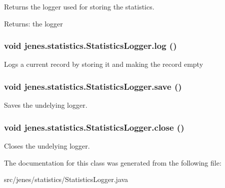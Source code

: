 Returns the logger used for storing the statistics.

\begin{Desc}
\item[Returns:]the logger \end{Desc}
\hypertarget{classjenes_1_1statistics_1_1_statistics_logger_35539d6c4f5664617185d68c6efdf66a}{
\subsubsection[log]{\setlength{\rightskip}{0pt plus 5cm}void jenes.statistics.StatisticsLogger.log ()}}
\label{classjenes_1_1statistics_1_1_statistics_logger_35539d6c4f5664617185d68c6efdf66a}


Logs a current record by storing it and making the record empty \hypertarget{classjenes_1_1statistics_1_1_statistics_logger_80cde2facc21c7398050e89131a7321e}{
\subsubsection[save]{\setlength{\rightskip}{0pt plus 5cm}void jenes.statistics.StatisticsLogger.save ()}}
\label{classjenes_1_1statistics_1_1_statistics_logger_80cde2facc21c7398050e89131a7321e}


Saves the undelying logger. \hypertarget{classjenes_1_1statistics_1_1_statistics_logger_ae3d375349f86fcd9a7ce450bae3d046}{
\subsubsection[close]{\setlength{\rightskip}{0pt plus 5cm}void jenes.statistics.StatisticsLogger.close ()}}
\label{classjenes_1_1statistics_1_1_statistics_logger_ae3d375349f86fcd9a7ce450bae3d046}


Closes the undelying logger. 

The documentation for this class was generated from the following file:\begin{CompactItemize}
\item 
src/jenes/statistics/StatisticsLogger.java\end{CompactItemize}
